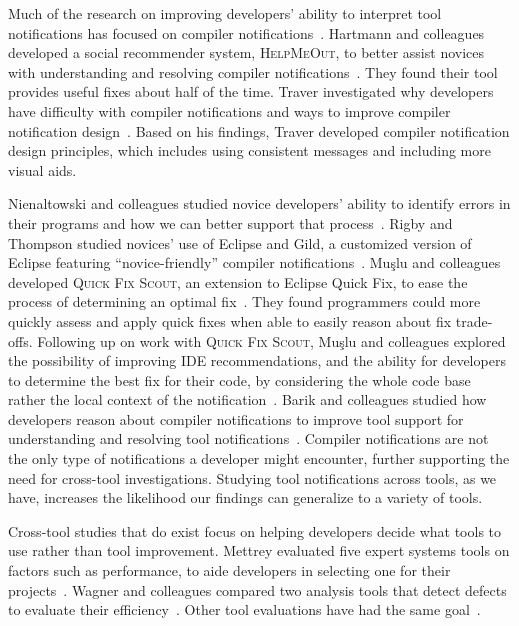 Much of the research on improving developers' ability to interpret tool notifications has focused on compiler notifications~\cite{Hartmann:2010:Suggestions,Traver:2010:Messages,barik14}. 
Hartmann and colleagues developed a social recommender system, \textsc{HelpMeOut}, to better assist novices with understanding and resolving compiler notifications~\cite{Hartmann:2010:Suggestions}. They found their tool provides useful fixes about half of the time. Traver investigated why developers have difficulty with compiler notifications and ways to improve compiler notification design~\cite{Traver:2010:Messages}. Based on his findings, Traver developed compiler notification design principles, which includes using consistent messages and including more visual aids.

Nienaltowski and colleagues studied novice developers' ability to identify errors in their programs and how we can better support that process~\cite{Nienaltowski:2008:Compiler}.
Rigby and Thompson studied novices' use of Eclipse and Gild, a customized version of Eclipse featuring ``novice-friendly'' compiler notifications~\cite{Rigby:2005:Novice}.
Mu\c{s}lu and colleagues developed \textsc{Quick Fix Scout}, an extension to Eclipse Quick Fix, to ease the process of determining an
optimal fix~\cite{Mucslu:2012:Speculative}. They found programmers could more quickly assess and apply quick fixes when able to easily reason about fix trade-offs.
Following up on work with \textsc{Quick Fix Scout}, Mu\c{s}lu and colleagues explored the possibility of improving IDE recommendations, and the ability for developers to determine the best fix for their code, by considering the whole code base rather the local context of the notification~\cite{mucslu2012improving}.
Barik and colleagues studied how developers reason about compiler notifications to improve tool support for understanding and resolving tool notifications~\cite{barik14}.
Compiler notifications are not the only type of notifications a developer might encounter, further supporting the need for cross-tool investigations.
Studying tool notifications across tools, as we have, increases the likelihood our findings can generalize to a variety of tools.

Cross-tool studies that do exist focus on helping developers decide what tools to use rather than tool improvement.
Mettrey evaluated five expert systems tools on factors such as performance, to aide developers in selecting one for their projects~\cite{mettrey1991comparative}.
Wagner and colleagues compared two analysis tools that detect defects to evaluate their efficiency~\cite{wagner2008evaluation}.
Other tool evaluations have had the same goal~\cite{roy2009comparison,zheng2006value}.

